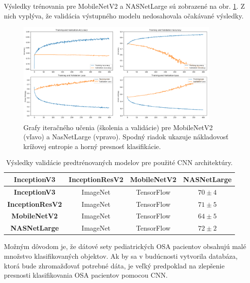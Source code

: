 Výsledky trénovania pre MobileNetV2 a NASNetLarge sú zobrazené na obr. \ref{fig:resers:d}. Z nich vyplýva, že validácia výstupného modelu nedosahovala očakávané výsledky. 


\begin{figure}[h]
	\centering
	\includegraphics[width=0.9\textwidth]{figures/resers_d.png}
	\caption{Grafy iteračného učenia (školenia a validácie) pre MobileNetV2 (vľavo) a NasNetLarge (vpravo). Spodný riadok ukazuje nákladovosť krížovej entropie a horný presnosť klasifikácie.}
	\label{fig:resers:d}
\end{figure}


\begin{table}[H]
	\caption{\label{tab:resers:1} Výsledky validácie predtrénovaných modelov pre použité CNN architektúry. }
	\centering
	\begin{tabular}{cccc}
		\toprule
		\textbf{InceptionV3} & \textbf{InceptionResV2} & \textbf{MobileNetV2} & \textbf{NASNetLarge}     \\ 
		\midrule
		\textbf{InceptionV3}           & ImageNet     	& TensorFlow    & $70 \pm 4$		\\ 
		\textbf{InceptionResV2}        & ImageNet		& TensorFlow  	& $71 \pm 5$		\\ 
		\textbf{MobileNetV2}           & ImageNet     	& TensorFlow    & $64 \pm 5$		\\ 
		\textbf{NASNetLarge}           & ImageNet     	& TensorFlow    & $72 \pm 2$		\\ 
		\bottomrule
	\end{tabular}
\end{table}

Možným dôvodom je, že dátové sety pediatrických OSA pacientov obsahujú malé množstvo klasifikovaných objektov. Ak by sa v budúcnosti vytvorila databáza, ktorá bude zhromažďovať potrebné dáta, je veľký predpoklad na zlepšenie presnosti klasifikovania OSA pacientov pomocou CNN.


